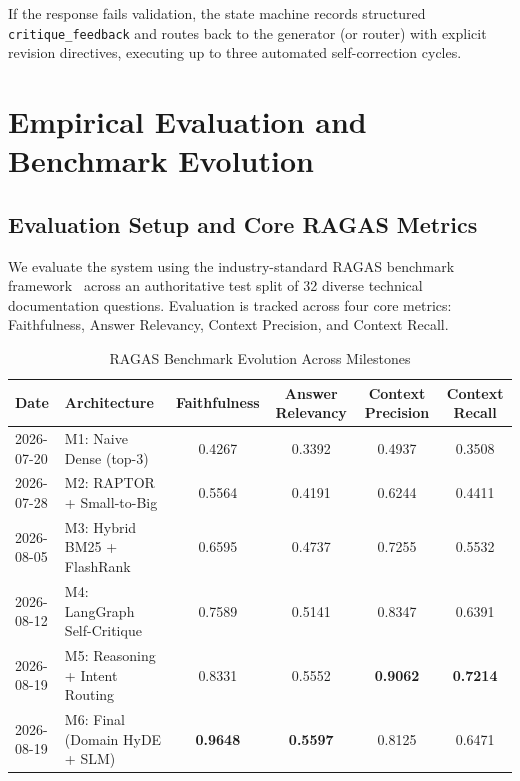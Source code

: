 \documentclass[sigconf,nonacm]{acmart}
\begin{document}
If the response fails validation, the state machine records structured \texttt{critique\_feedback} and routes back to the generator (or router) with explicit revision directives, executing up to three automated self-correction cycles.

\section{Empirical Evaluation and Benchmark Evolution}

\subsection{Evaluation Setup and Core RAGAS Metrics}
We evaluate the system using the industry-standard RAGAS benchmark framework~\cite{ragas} across an authoritative test split of 32 diverse technical documentation questions. Evaluation is tracked across four core metrics: Faithfulness, Answer Relevancy, Context Precision, and Context Recall.

\begin{table}[t]
\centering
\caption{RAGAS Benchmark Evolution Across Milestones}
\label{tab:evolution}
\small
\begin{tabular}{llcccc}
\toprule
\textbf{Date} & \textbf{Architecture} & \textbf{Faithfulness} & \textbf{Answer Relevancy} & \textbf{Context Precision} & \textbf{Context Recall} \\
\midrule
2026-07-20 & M1: Naive Dense (top-3) & 0.4267 & 0.3392 & 0.4937 & 0.3508 \\
2026-07-28 & M2: RAPTOR + Small-to-Big & 0.5564 & 0.4191 & 0.6244 & 0.4411 \\
2026-08-05 & M3: Hybrid BM25 + FlashRank & 0.6595 & 0.4737 & 0.7255 & 0.5532 \\
2026-08-12 & M4: LangGraph Self-Critique & 0.7589 & 0.5141 & 0.8347 & 0.6391 \\
2026-08-19 & M5: Reasoning + Intent Routing & 0.8331 & 0.5552 & \textbf{0.9062} & \textbf{0.7214} \\
2026-08-19 & M6: Final (Domain HyDE + SLM) & \textbf{0.9648} & \textbf{0.5597} & 0.8125 & 0.6471 \\
\bottomrule
\end{tabular}
\end{table}
\end{document}
